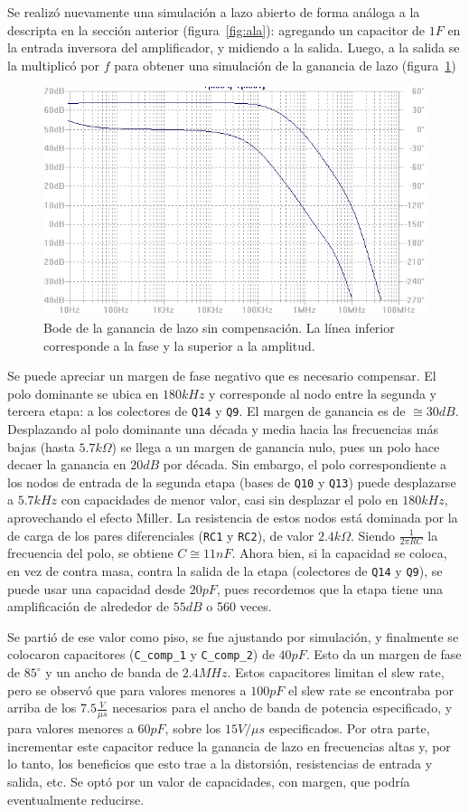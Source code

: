 \documentclass[a4paper,12pt,twoside]{article}
\begin{document}
Se realizó nuevamente una simulación a lazo abierto de forma análoga a la descripta en la sección anterior (figura~\ref{fig:ala}): agregando un capacitor de $1F$ en la entrada inversora del amplificador, y midiendo a la salida. Luego, a la salida se la multiplicó por $f$ para obtener una simulación de la ganancia de lazo (figura~\ref{fig:bode-la-sin-comp})

\begin{figure}[H]
	\centering
	\includegraphics[height=0.4\textwidth]{img/sim/bode-la-sin-comp}
	\caption{Bode de la ganancia de lazo sin compensación. La línea inferior corresponde a la fase y la superior a la amplitud.}
	\label{fig:bode-la-sin-comp}
\end{figure}

Se puede apreciar un margen de fase negativo que es necesario compensar. El polo dominante se ubica en $180kHz$ y corresponde al nodo entre la segunda y tercera etapa: a los colectores de \texttt{Q14} y \texttt{Q9}. El margen de ganancia es de $\cong 30dB$. Desplazando al polo dominante una década y media hacia las frecuencias más bajas (hasta $5.7k\Omega$) se llega a un margen de ganancia nulo, pues un polo hace decaer la ganancia en $20dB$ por década. Sin embargo, el polo correspondiente a los nodos de entrada de la segunda etapa (bases de \texttt{Q10} y \texttt{Q13}) puede desplazarse a $5.7kHz$ con capacidades de menor valor, casi sin desplazar el polo en $180kHz$, aprovechando el efecto Miller. 
La resistencia de estos nodos está dominada por la de carga de los pares diferenciales (\texttt{RC1} y \texttt{RC2}), de valor $2.4k\Omega$. Siendo $\frac{1}{2 \pi RC}$ la frecuencia del polo, se obtiene $C\cong 11nF$. Ahora bien, si la capacidad se coloca, en vez de contra masa, contra la salida de la etapa (colectores de \texttt{Q14} y \texttt{Q9}), se puede usar una capacidad desde $20pF$, pues recordemos que la etapa tiene una amplificación de alrededor de $55dB$ o 560 veces. 

Se partió de ese valor como piso, se fue ajustando por simulación, y finalmente se colocaron capacitores (\texttt{C\_comp\_1} y \texttt{C\_comp\_2}) de $40pF$. Esto da un margen de fase de $85^{\circ}$ y un ancho de banda de $2.4MHz$. Estos capacitores limitan el slew rate, pero se observó que para valores menores a $100pF$ el slew rate se encontraba por arriba de los $7.5\frac{V}{\mu s}$ necesarios para el ancho de banda de potencia especificado, y para valores menores a $60pF$, sobre los $15V/\mu s$ especificados. Por otra parte, incrementar este capacitor reduce la ganancia de lazo en frecuencias altas y, por lo tanto, los beneficios que esto trae a la distorsión, resistencias de entrada y salida, etc. Se optó por un valor de capacidades, con margen, que podría eventualmente reducirse.
\end{document}
